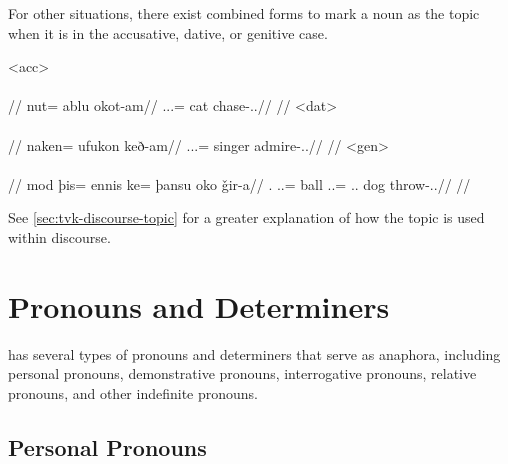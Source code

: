For other situations, there exist combined forms to mark a noun as the topic when it is in the accusative, dative, or genitive case.

	\a<acc>\begingl
		\glpreamble{}\\
		\\
		//
		\gla nut= ablu okot-am//
		\glb \An.\Sg.\Acc.\Top= cat chase-\Ind.\Pst.\Ipfv//
		\glft{}//
	\endgl
	\a<dat>\begingl
		\glpreamble{}\\
		\\
		//
		\gla naken= ufukon keð-am//
		\glb \An.\Pl.\Dat.\Top= singer admire-\Ind.\Pst.\Ipfv//
		\glft{}//
	\endgl
	\a<gen>\begingl
		\glpreamble{}\\
		\\
		//
		\gla mod þis= ennis ke= þansu oko ǧir-a//
		\glb \Fps.\Erg{} \In.\Sg.\Acc= ball \An.\Sg.\Dat= \Sps.\Gen.\Top{} dog throw-\Ind.\Npst.\Ipfv//
		\glft{}//
	\endgl
\xe

See \autoref{sec:tvk-discourse-topic} for a greater explanation of how the topic is used within discourse.

\section{Pronouns and Determiners}
\label{sec:tvk-pronouns-determiners}
\langtvk{} has several types of pronouns and determiners that serve as anaphora, including personal pronouns, demonstrative pronouns, interrogative pronouns, relative pronouns, and other indefinite pronouns.

\subsection{Personal Pronouns}
\label{subsec:tvk-personal-pronouns}

